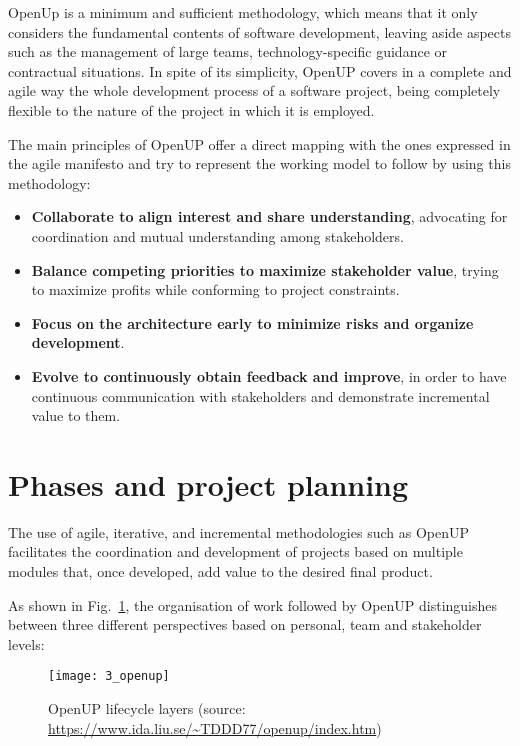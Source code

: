 OpenUp is a minimum and sufficient methodology, which means that it only considers the fundamental contents of software development, leaving aside aspects such as the management of large teams, technology-specific guidance or contractual situations. In spite of its simplicity, OpenUP covers in a complete and agile way the whole development process of a software project, being completely flexible to the nature of the project in which it is employed.

The main principles of OpenUP offer a direct mapping with the ones expressed in the agile manifesto and try to represent the working model to follow by using this methodology:

\begin{itemize}
\item \textbf{Collaborate to align interest and share understanding}, advocating for coordination and mutual understanding among stakeholders.

\item \textbf{Balance competing priorities to maximize stakeholder value}, trying to maximize profits while conforming to project constraints.

\item \textbf{Focus on the architecture early to minimize risks and organize development}.

\item \textbf{Evolve to continuously obtain feedback and improve}, in order to have continuous communication with stakeholders and demonstrate incremental value to them.

\end{itemize}

\section{Phases and project planning}
\label{sec:phasesAndPlanning}

The use of agile, iterative, and incremental methodologies such as OpenUP facilitates the coordination and development of projects based on multiple modules that, once developed, add value to the desired final product.

As shown in Fig.~\ref{fig:openUP}, the organisation of work followed by OpenUP distinguishes between three different perspectives based on personal, team and stakeholder levels:

\begin{figure}[htb]
	\centering
	\texttt{[image: 3\_openup]}
	\caption[OpenUP lifecycle]{OpenUP lifecycle layers (source: \url{https://www.ida.liu.se/~TDDD77/openup/index.htm})}
	\label{fig:openUP}
\end{figure}

